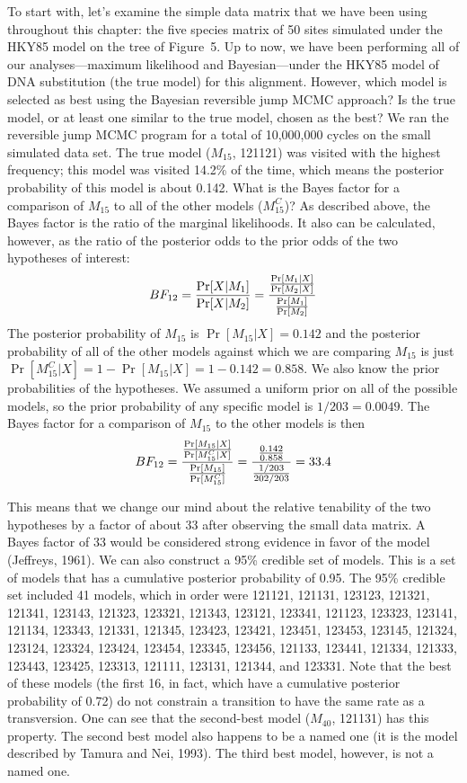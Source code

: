 \documentclass{svmult}
\begin{document}
To start with, let's examine the simple data matrix that we have been using throughout this
chapter: the five species matrix of 50 sites simulated under the HKY85 model on the tree of
Figure~5. Up to now, we have been performing all of our analyses---maximum likelihood and
Bayesian---under the HKY85 model of DNA substitution (the true model) for this alignment. However,
which model is selected as best using the Bayesian reversible jump MCMC approach? Is the true
model, or at least one similar to the true model, chosen as the best?  We ran the reversible jump
MCMC program for a total of 10,000,000 cycles on the small simulated data set. The true model
($M_{15}$, 121121) was visited with the highest frequency; this model was visited 14.2\% of the
time, which means the posterior probability of this model is about 0.142. What is the Bayes factor
for a comparison of $M_{15}$ to all of the other models ($M_{15}^C$)? As described above, the Bayes
factor is the ratio of the marginal likelihoods. It also can be calculated, however, as the ratio
of the posterior odds to the prior odds of the two hypotheses of interest:
$$
BF_{12} = {\Pr[X | M_1] \over \Pr[X | M_2]} = { {\Pr[M_1 | X] \over \Pr[M_2 | X]} \over {\Pr[M_1] \over \Pr[M_2]} }
$$
The posterior probability of $M_{15}$ is $\Pr[M_{15} | X] = 0.142$ and the posterior probability of
all of the other models against which we are comparing $M_{15}$ is just $\Pr[M_{15}^C | X] = 1 -
\Pr[M_{15} | X]  = 1 - 0.142 = 0.858$. We also know the prior probabilities of the hypotheses. We
assumed a uniform prior on all of the possible models, so the prior probability of any specific
model is $1 / 203 = 0.0049$. The Bayes factor for a comparison of $M_{15}$ to the other models is
then
$$
BF_{12} = { {\Pr[M_{15} | X] \over \Pr[M_{15}^C | X]} \over {\Pr[M_{15}] \over \Pr[M_{15}^C]} } = 
{ {0.142 \over 0.858} \over {1/203 \over 202/203} } = 33.4
$$

This means that we change our mind about the relative tenability of the two hypotheses by a factor
of about 33 after observing the small data matrix. A Bayes factor of 33 would be considered strong
evidence in favor of the model (Jeffreys, 1961). We can also construct a 95\% credible set of
models. This is a set of models that has a cumulative posterior probability of 0.95. The 95\%
credible set included 41 models, which in order were
121121, 121131, 123123, 121321, 121341, 123143, 121323, 123321, 121343, 123121, 
123341, 121123, 123323, 123141, 121134, 123343, 121331, 121345, 123423, 123421, 
123451, 123453, 123145, 121324, 123124, 123324, 123424, 123454, 123345, 123456, 
121133, 123441, 121334, 121333, 123443, 123425, 123313, 121111, 123131, 121344, 
and 123331. Note that the best of these models (the first 16, in fact, which have a cumulative
posterior probability of 0.72) do not constrain a transition to have the same rate as a
transversion. One can see that the second-best model ($M_{40}$, 121131) has this property. The
second best model also happens to be a named one (it is the model described by Tamura and Nei,
1993). The third best model, however, is not a named one.
\end{document}
